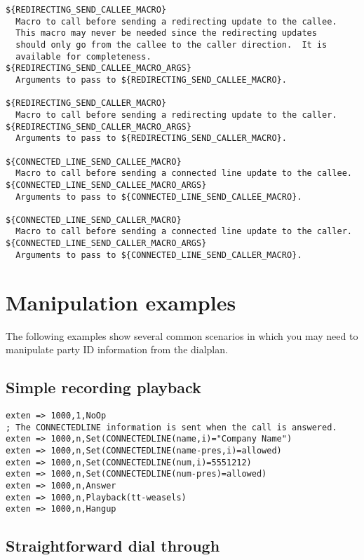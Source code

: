 \begin{verbatim}
${REDIRECTING_SEND_CALLEE_MACRO}
  Macro to call before sending a redirecting update to the callee.
  This macro may never be needed since the redirecting updates
  should only go from the callee to the caller direction.  It is
  available for completeness.
${REDIRECTING_SEND_CALLEE_MACRO_ARGS}
  Arguments to pass to ${REDIRECTING_SEND_CALLEE_MACRO}.

${REDIRECTING_SEND_CALLER_MACRO}
  Macro to call before sending a redirecting update to the caller.
${REDIRECTING_SEND_CALLER_MACRO_ARGS}
  Arguments to pass to ${REDIRECTING_SEND_CALLER_MACRO}.

${CONNECTED_LINE_SEND_CALLEE_MACRO}
  Macro to call before sending a connected line update to the callee.
${CONNECTED_LINE_SEND_CALLEE_MACRO_ARGS}
  Arguments to pass to ${CONNECTED_LINE_SEND_CALLEE_MACRO}.

${CONNECTED_LINE_SEND_CALLER_MACRO}
  Macro to call before sending a connected line update to the caller.
${CONNECTED_LINE_SEND_CALLER_MACRO_ARGS}
  Arguments to pass to ${CONNECTED_LINE_SEND_CALLER_MACRO}.
\end{verbatim}

\section{Manipulation examples}

The following examples show several common scenarios in which you may need
to manipulate party ID information from the dialplan.

\subsection{Simple recording playback}

\begin{verbatim}
exten => 1000,1,NoOp
; The CONNECTEDLINE information is sent when the call is answered.
exten => 1000,n,Set(CONNECTEDLINE(name,i)="Company Name")
exten => 1000,n,Set(CONNECTEDLINE(name-pres,i)=allowed)
exten => 1000,n,Set(CONNECTEDLINE(num,i)=5551212)
exten => 1000,n,Set(CONNECTEDLINE(num-pres)=allowed)
exten => 1000,n,Answer
exten => 1000,n,Playback(tt-weasels)
exten => 1000,n,Hangup
\end{verbatim}

\subsection{Straightforward dial through}

